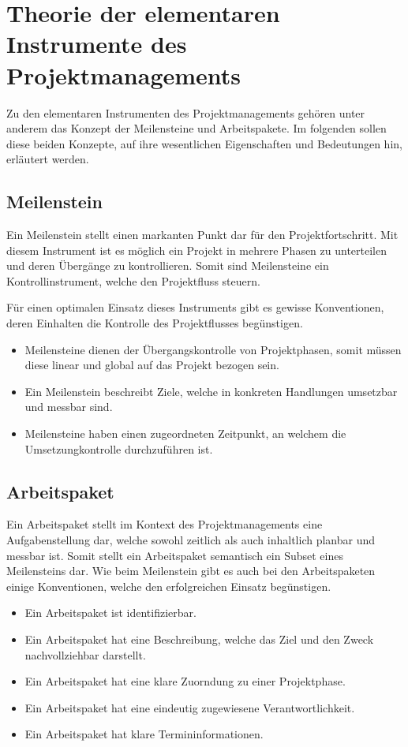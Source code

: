\section{Theorie der elementaren Instrumente des Projektmanagements}
Zu den elementaren Instrumenten des Projektmanagements gehören unter
anderem das Konzept der Meilensteine und Arbeitspakete. Im folgenden
sollen diese beiden Konzepte, auf ihre wesentlichen Eigenschaften und
Bedeutungen hin, erläutert werden.

\subsection{Meilenstein}
Ein Meilenstein stellt einen markanten Punkt dar für den
Projektfortschritt. Mit diesem Instrument ist es möglich ein Projekt
in mehrere Phasen zu unterteilen und deren Übergänge zu kontrollieren.
Somit sind Meilensteine ein Kontrollinstrument, welche den
Projektfluss steuern.

Für einen optimalen Einsatz dieses Instruments gibt es gewisse
Konventionen, deren Einhalten die Kontrolle des Projektflusses
begünstigen.

\begin{itemize}
	\item Meilensteine dienen der Übergangskontrolle von
		Projektphasen, somit müssen diese linear und
		global auf das Projekt bezogen sein.
	\item Ein Meilenstein beschreibt Ziele, welche in konkreten
		Handlungen umsetzbar und messbar sind.
	\item Meilensteine haben einen zugeordneten Zeitpunkt, an
		welchem die Umsetzungkontrolle durchzuführen ist.
\end{itemize}

\subsection{Arbeitspaket}
Ein Arbeitspaket stellt im Kontext des Projektmanagements eine
Aufgabenstellung dar, welche sowohl zeitlich als auch inhaltlich
planbar und messbar ist. Somit stellt ein Arbeitspaket semantisch ein
Subset eines Meilensteins dar. Wie beim Meilenstein gibt es auch bei
den Arbeitspaketen einige Konventionen, welche den erfolgreichen
Einsatz begünstigen.

\begin{itemize}
	\item Ein Arbeitspaket ist identifizierbar.
	\item Ein Arbeitspaket hat eine Beschreibung, welche das Ziel
		und den Zweck nachvollziehbar darstellt.
	\item Ein Arbeitspaket hat eine klare Zuorndung zu einer
		Projektphase.
	\item Ein Arbeitspaket hat eine eindeutig zugewiesene
		Verantwortlichkeit.
	\item Ein Arbeitspaket hat klare Termininformationen.
\end{itemize}
